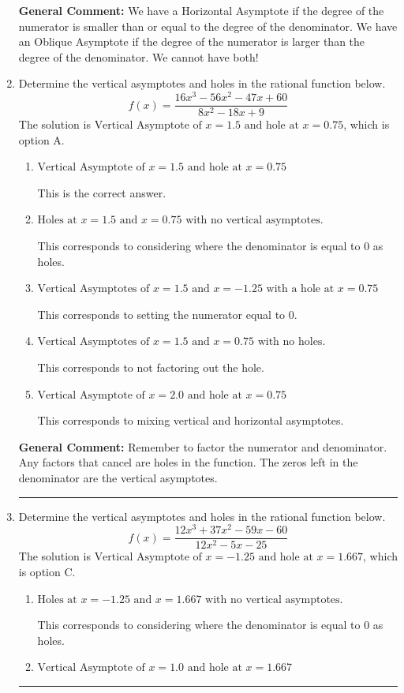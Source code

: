 \documentclass{extbook}[14pt]
\newcommand{\litem}[1]{\item #1

\rule{\textwidth}{0.4pt}}
\begin{document}
\begin{enumerate}
{\textbf{General Comment:} We have a Horizontal Asymptote if the degree of the numerator is smaller than or equal to the degree of the denominator. We have an Oblique Asymptote if the degree of the numerator is larger than the degree of the denominator. We cannot have both!
}
\litem{
Determine the vertical asymptotes and holes in the rational function below.
\[ f(x) = \frac{16x^{3} -56 x^{2} -47 x + 60}{8x^{2} -18 x + 9} \]The solution is \( \text{Vertical Asymptote of } x = 1.5 \text{ and hole at } x = 0.75 \), which is option A.\begin{enumerate}[label=\Alph*.]
\item \( \text{Vertical Asymptote of } x = 1.5 \text{ and hole at } x = 0.75 \)

This is the correct answer.
\item \( \text{Holes at } x = 1.5 \text{ and } x = 0.75 \text{ with no vertical asymptotes.} \)

This corresponds to considering where the denominator is equal to 0 as holes.
\item \( \text{Vertical Asymptotes of } x = 1.5 \text{ and } x = -1.25 \text{ with a hole at } x = 0.75 \)

This corresponds to setting the numerator equal to 0.
\item \( \text{Vertical Asymptotes of } x = 1.5 \text{ and } x = 0.75 \text{ with no holes.} \)

This corresponds to not factoring out the hole.
\item \( \text{Vertical Asymptote of } x = 2.0 \text{ and hole at } x = 0.75 \)

This corresponds to mixing vertical and horizontal asymptotes.
\end{enumerate}

\textbf{General Comment:} Remember to factor the numerator and denominator. Any factors that cancel are holes in the function. The zeros left in the denominator are the vertical asymptotes.
}
\litem{
Determine the vertical asymptotes and holes in the rational function below.
\[ f(x) = \frac{12x^{3} +37 x^{2} -59 x -60}{12x^{2} -5 x -25} \]The solution is \( \text{Vertical Asymptote of } x = -1.25 \text{ and hole at } x = 1.667 \), which is option C.\begin{enumerate}[label=\Alph*.]
\item \( \text{Holes at } x = -1.25 \text{ and } x = 1.667 \text{ with no vertical asymptotes.} \)

This corresponds to considering where the denominator is equal to 0 as holes.
\item \( \text{Vertical Asymptote of } x = 1.0 \text{ and hole at } x = 1.667 \)


\end{enumerate}}
\end{enumerate}
\end{document}
